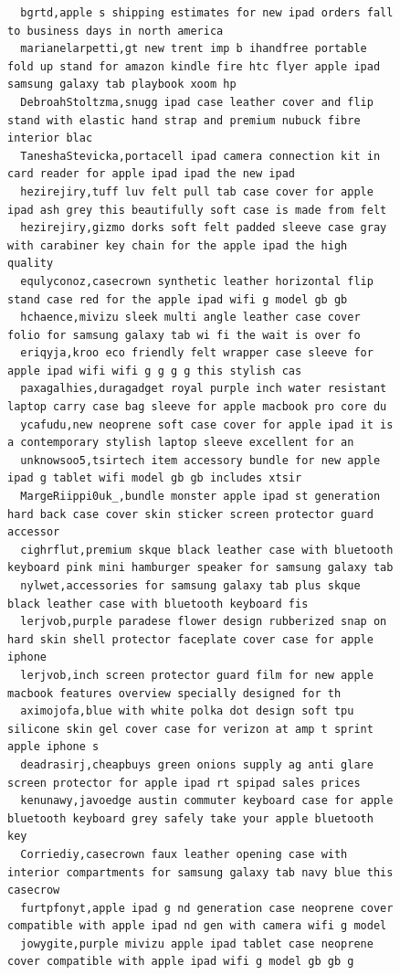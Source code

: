 \begin{figure}[htpb]
\begin{verbatim}
  bgrtd,apple s shipping estimates for new ipad orders fall to business days in north america
  marianelarpetti,gt new trent imp b ihandfree portable fold up stand for amazon kindle fire htc flyer apple ipad samsung galaxy tab playbook xoom hp
  DebroahStoltzma,snugg ipad case leather cover and flip stand with elastic hand strap and premium nubuck fibre interior blac
  TaneshaStevicka,portacell ipad camera connection kit in card reader for apple ipad ipad the new ipad
  hezirejiry,tuff luv felt pull tab case cover for apple ipad ash grey this beautifully soft case is made from felt
  hezirejiry,gizmo dorks soft felt padded sleeve case gray with carabiner key chain for the apple ipad the high quality
  equlyconoz,casecrown synthetic leather horizontal flip stand case red for the apple ipad wifi g model gb gb
  hchaence,mivizu sleek multi angle leather case cover folio for samsung galaxy tab wi fi the wait is over fo
  eriqyja,kroo eco friendly felt wrapper case sleeve for apple ipad wifi wifi g g g g this stylish cas
  paxagalhies,duragadget royal purple inch water resistant laptop carry case bag sleeve for apple macbook pro core du
  ycafudu,new neoprene soft case cover for apple ipad it is a contemporary stylish laptop sleeve excellent for an
  unknowsoo5,tsirtech item accessory bundle for new apple ipad g tablet wifi model gb gb includes xtsir
  MargeRiippi0uk_,bundle monster apple ipad st generation hard back case cover skin sticker screen protector guard accessor
  cighrflut,premium skque black leather case with bluetooth keyboard pink mini hamburger speaker for samsung galaxy tab
  nylwet,accessories for samsung galaxy tab plus skque black leather case with bluetooth keyboard fis
  lerjvob,purple paradese flower design rubberized snap on hard skin shell protector faceplate cover case for apple iphone
  lerjvob,inch screen protector guard film for new apple macbook features overview specially designed for th
  aximojofa,blue with white polka dot design soft tpu silicone skin gel cover case for verizon at amp t sprint apple iphone s
  deadrasirj,cheapbuys green onions supply ag anti glare screen protector for apple ipad rt spipad sales prices
  kenunawy,javoedge austin commuter keyboard case for apple bluetooth keyboard grey safely take your apple bluetooth key
  Corriediy,casecrown faux leather opening case with interior compartments for samsung galaxy tab navy blue this casecrow
  furtpfonyt,apple ipad g nd generation case neoprene cover compatible with apple ipad nd gen with camera wifi g model
  jowygite,purple mivizu apple ipad tablet case neoprene cover compatible with apple ipad wifi g model gb gb g

\end{verbatim}
\end{figure}
